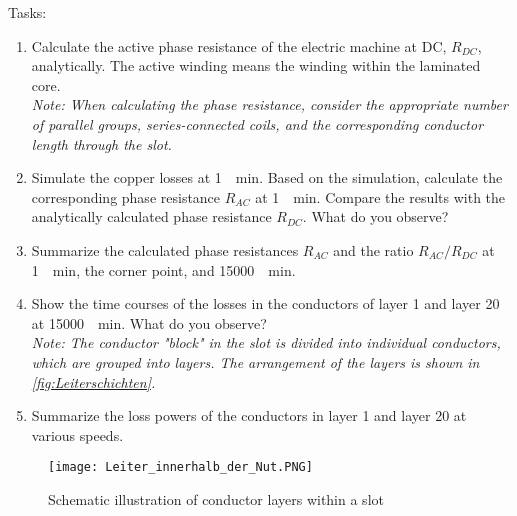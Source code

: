 Tasks:
\begin{enumerate}
	\item Calculate the active phase resistance of the electric machine at DC, $R_{DC}$, analytically. The active winding means the winding within the laminated core. \\
	\textit{Note: When calculating the phase resistance, consider the appropriate number of parallel groups, series-connected coils, and the corresponding conductor length through the slot.}

	\item Simulate the copper losses at \SI{1}{\per\minute}. Based on the simulation, calculate the corresponding phase resistance $R_{AC}$ at \SI{1}{\per\minute}. Compare the results with the analytically calculated phase resistance $R_{DC}$. What do you observe?

	\item Summarize the calculated phase resistances $R_{AC}$ and the ratio $R_{AC}/R_{DC}$ at \SI{1}{\per\minute}, the corner point, and \SI{15000}{\per\minute}. 

	\item Show the time courses of the losses in the conductors of layer 1 and layer 20 at \SI{15000}{\per\minute}. What do you observe? \\
	\textit{Note: The conductor "block" in the slot is divided into individual conductors, which are grouped into layers. The arrangement of the layers is shown in \autoref{fig:Leiterschichten}.}

	\item Summarize the loss powers of the conductors in layer 1 and layer 20 at various speeds.
\end{enumerate}

\begin{figure}[h]
	\centering
	\texttt{[image: Leiter\_innerhalb\_der\_Nut.PNG]}
	\caption{Schematic illustration of conductor layers within a slot}
	\label{fig:Leiterschichten}
\end{figure}

